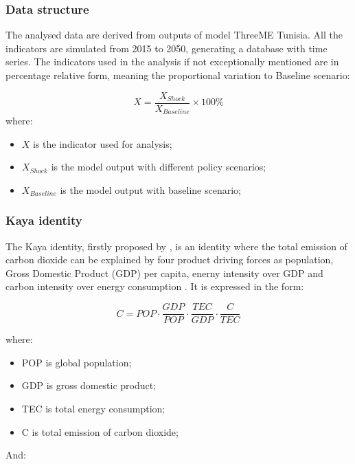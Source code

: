 \documentclass[
]{article}
\providecommand{\tightlist}{%
  \setlength{\itemsep}{0pt}\setlength{\parskip}{0pt}}
\begin{document}
\hypertarget{data-structure}{%
\subsubsection{Data structure}\label{data-structure}}

The analysed data are derived from outputs of model ThreeME Tunisia. All
the indicators are simulated from 2015 to 2050, generating a database
with time series. The indicators used in the analysis if not
exceptionally mentioned are in percentage relative form, meaning the
proportional variation to Baseline scenario:

\[ X = \frac{X_{Shock}}{X_{Baseline}} \times 100\% \tag{1}\] where:

\begin{itemize}
\tightlist
\item
  \(X\) is the indicator used for analysis;
\item
  \(X_{Shock}\) is the model output with different policy scenarios;
\item
  \(X_{Baseline}\) is the model output with baseline scenario;
\end{itemize}

\hypertarget{kaya-identity}{%
\subsubsection{Kaya identity}\label{kaya-identity}}

The Kaya identity, firstly proposed by \autocite{kaya1989}, is an
identity where the total emission of carbon dioxide can be explained by
four product driving forces as population, Gross Domestic Product (GDP)
per capita, enerny intensity over GDP and carbon intensity over energy
consumption \autocite{kayaide2021}. It is expressed in the form:

\[ C = POP \cdot \frac{GDP}{POP} \cdot \frac{TEC}{GDP} \cdot \frac{C}{TEC} \tag{1}\]

where:

\begin{itemize}
\tightlist
\item
  POP is global population;
\item
  GDP is gross domestic product;
\item
  TEC is total energy consumption;
\item
  C is total emission of carbon dioxide;
\end{itemize}

And:
\end{document}
